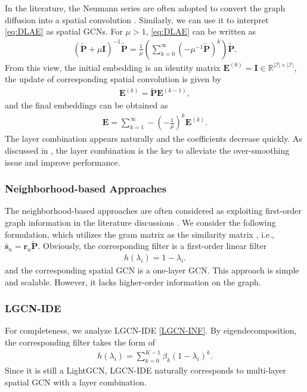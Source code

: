 \documentclass[sigconf]{acmart}
\begin{document}
In the literature, the Neumann series are often adopted to convert the graph diffusion into a spatial convolution \cite{klicpera2018predict,xhonneux2020continuous}. Similarly, we can use it to interpret \eqref{eq:DLAE} as spatial GCNs. For $\mu > 1$, \eqref{eq:DLAE} can be written as 
\begin{align}\label{eq:ae}
    (\tilde{\bm{P}} + \mu \bm{I})^{-1} \tilde{\bm{P}} =  \frac{1}{\mu} \left(\sum_{k=0}^{\infty} (-\mu^{-1} \tilde{\bm{P}})^k \right) \tilde{\bm{P}}.
\end{align}
From this view, the initial embedding is an identity matrix $\bm{E}^{(0)} = \bm{I} \in \mathbb{R}^{|\mathcal{I}| \times |\mathcal{I}|}$, the update of corresponding spatial convolution is given by
\begin{align*}
    \bm{E}^{(k)} = \tilde{\bm{P}} \bm{E}^{(k-1)},
\end{align*}
and the final embeddings can be obtained as
\begin{align*}
    \bm{E} = \sum_{k=1}^{\infty} - \left(-\frac{1}{\mu} \right)^k \bm{E}^{(k)}.
\end{align*}
The layer combination appears naturally and the coefficients decrease quickly. As discussed in \cite{he2020lightgcn}, the layer combination is the key to alleviate the over-smoothing issue and improve performance.

 



\subsubsection{Neighborhood-based Approaches} The neighborhood-based approaches are often considered as exploiting first-order graph information in the literature discussions \cite{he2020lightgcn}. We consider the following formulation, which utilizes the gram matrix as the similarity matrix \cite{aiolli2013efficient}, i.e., $ \bar{\bm{s}}_u = \bm{r}_u \tilde{\bm{P}}$. Obviously, the corresponding filter is a first-order linear filter
\begin{align*}
    h(\lambda_i) = 1 - \lambda_i.
\end{align*}
and the corresponding spatial GCN is a one-layer GCN. This approach is simple and scalable. However, it lacks higher-order information on the graph. 

\subsubsection{LGCN-IDE} For completeness, we analyze LGCN-IDE \eqref{LGCN-INF}. By eigendecomposition, the corresponding filter takes the form of 
\begin{align*}
    h(\lambda_i) = \sum_{k=0}^{K-1} \beta_k (1 - \lambda_i)^k.
\end{align*}
Since it is still a LightGCN, LGCN-IDE naturally corresponds to multi-layer spatial GCN with a layer combination. 
\end{document}
